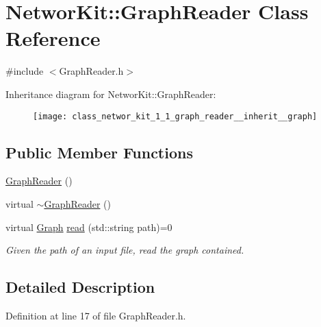 \hypertarget{class_networ_kit_1_1_graph_reader}{\section{Networ\-Kit\-:\-:Graph\-Reader Class Reference}
\label{class_networ_kit_1_1_graph_reader}
}


{\ttfamily \#include $<$Graph\-Reader.\-h$>$}



Inheritance diagram for Networ\-Kit\-:\-:Graph\-Reader\-:\nopagebreak
\begin{figure}[H]
\begin{center}
\leavevmode
\texttt{[image: class\_networ\_kit\_1\_1\_graph\_reader\_\_inherit\_\_graph]}
\end{center}
\end{figure}
\subsection*{Public Member Functions}
\begin{DoxyCompactItemize}
\item 
\hyperlink{class_networ_kit_1_1_graph_reader_ad7970634a2908b70b1603d7211761000}{Graph\-Reader} ()
\item 
virtual \hyperlink{class_networ_kit_1_1_graph_reader_a95fd03027a974deb1b90f64e7bb8ea99}{$\sim$\-Graph\-Reader} ()
\item 
virtual \hyperlink{class_networ_kit_1_1_graph}{Graph} \hyperlink{class_networ_kit_1_1_graph_reader_a0ba1d66a137702c06be52c648b95d572}{read} (std\-::string path)=0
\begin{DoxyCompactList}\small\item\em Given the path of an input file, read the graph contained. \end{DoxyCompactList}\end{DoxyCompactItemize}


\subsection{Detailed Description}


Definition at line 17 of file Graph\-Reader.\-h.



